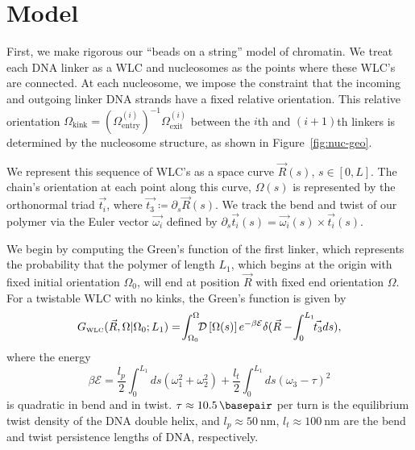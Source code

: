 \documentclass[%
 reprint,
superscriptaddress,
showpacs,preprintnumbers,
 amsmath,amssymb,
 aps,
 prl,
]{revtex4-1}
\newcommand{\gwlc}[2][\Omega_0; L_0]{G_\text{\tiny WLC}(#2|#1)}
\newcommand{\greens}[2][\Omega_0; L]{G(#2|#1)}
\newcommand{\pathd}[1]{\mathcal{D}\left[#1\right]}
\newcommand{\energy}{\mathcal{E}}
\begin{document}

\section{\label{sec:model}Model}
First, we make rigorous our ``beads on a string'' model of chromatin.
We treat each DNA linker as a WLC and nucleosomes as the points where these
    WLC's are connected.
At each nucleosome, we impose the constraint that the incoming and outgoing
    linker DNA strands have a fixed relative orientation. This relative
    orientation $\Omega_\text{kink}  = {(\Omega^{(i)}_\text{entry})}^{-1}
    \Omega^{(i)}_\text{exit}$ between the $i$th and $(i+1)$th linkers is
    determined by the nucleosome structure, as shown in
    Figure~\ref{fig:nuc-geo}.

We represent this sequence of WLC's as a space curve $\vec{R}(s)$, $s\in[0,L]$. 
    The chain's orientation at each point along this curve, $\Omega(s)$ is
    represented by the orthonormal triad
    $\vec{t_i}$, where $\vec{t_3} \coloneqq \partial_s \vec{R}(s)$.
We track the bend and twist of our polymer via the Euler vector $\vec{\omega_i}$
    defined by ${\partial_s \vec{t_i}(s) = \vec{\omega_i}(s) \times
    \vec{t_i}(s)}$.

We begin by computing the Green's function of the first linker, which represents
the probability that the polymer of length $L_1$, which begins at
the origin with fixed initial orientation $\Omega_0$, will end at position
$\vec{R}$ with fixed end orientation $\Omega$.
For a twistable WLC with no kinks, the Green's function is given by
\begin{equation}\label{eq:path}
    \gwlc[\Omega_0;L_1]{\vec{R}, \Omega} =\! \int_{\Omega_0}^{\Omega} \!\! \pathd{\Omega(s)}
              e^{-\beta \mathcal{E}}\delta(\vec{R} - \!\int_{0}^{L_1} \!\!\vec{t_3} ds),
\end{equation}
    where the energy
\begin{equation}\label{eq:energy}
    \beta\energy = \frac{l_p}{2}\int_{0}^{L_1} ds
    (\omega_1^2 + \omega_2 ^2) + \frac{l_t}{2}\int_{0}^{L_1} ds
    {\left(\omega_3 - \tau\right)}^2
\end{equation}
    is quadratic in bend and in twist. {$\tau \approx \SI{10.5}{\basepair}$}
    per turn is the equilibrium twist density of the DNA double helix, and {$l_p
    \approx \SI{50}{\nano\metre}$}, {$l_t \approx \SI{100}{\nano\metre}$} are
    the bend and twist persistence lengths of DNA, respectively.
\end{document}
